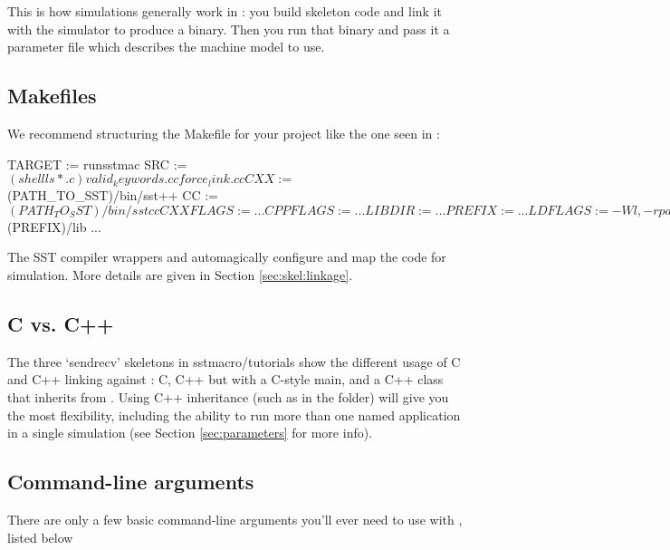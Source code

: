 This is how simulations generally work in \sstmacro: you build skeleton code and link it with the simulator to produce a binary.  
Then you run that binary and pass it a parameter file which describes the machine model to use.

\subsection{Makefiles}
\label{subsec:tutorial:makefiles}

We recommend structuring the Makefile for your project like the one seen in  :

\begin{ViFile}
TARGET := runsstmac
SRC := $(shell ls *.c) valid_keywords.cc force_link.cc

CXX :=      $(PATH_TO_SST)/bin/sst++
CC :=        $(PATH_TO_SST)/bin/sstcc
CXXFLAGS := ...
CPPFLAGS := ...
LIBDIR :=  ...
PREFIX :=   ...
LDFLAGS :=  -Wl,-rpath,$(PREFIX)/lib
...
\end{ViFile}
The SST compiler wrappers  and  automagically configure and map the code for simulation.  More details are given in Section \ref{sec:skel:linkage}.

\subsection{C vs. C++}
\label{subsec:tutorial:cprog}

The three `sendrecv' skeletons in sstmacro/tutorials show the 
different usage of C and C++ linking against \sstmacro: C, C++ but with a C-style main, and a C++ class that inherits from .   
Using C++ inheritance (such as in the  folder) will 
give you the most flexibility, including the ability to run more than one named application in a single simulation (see Section \ref{sec:parameters} for more info).  

\subsection{Command-line arguments}
\label{subsec:tutorial:cmdline}

There are only a few basic command-line arguments you'll ever need to use with \sstmacro, listed below

